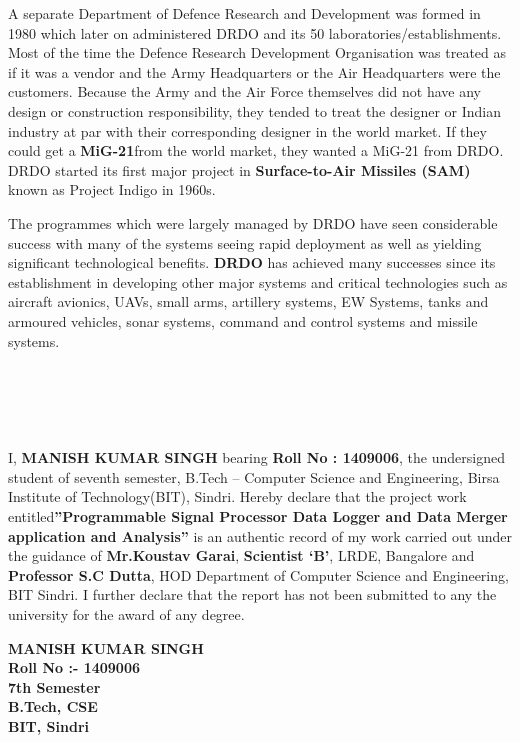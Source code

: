 \documentclass[14pt]{article} %
\begin{document}
  \par            A separate Department of Defence Research and Development was formed in 1980 which later on administered DRDO and its 50 laboratories/establishments. Most of the time the Defence Research Development Organisation was treated as if it was a vendor and the Army Headquarters or the Air Headquarters were the customers. Because the Army and the Air Force themselves did not have any design or construction responsibility, they tended to treat the designer or Indian industry at par with their corresponding designer in the world market. If they could get a \textbf{MiG-21}from the world market, they wanted a MiG-21 from DRDO. DRDO started its first major project in \textbf{Surface-to-Air Missiles (SAM)} known as Project Indigo in 1960s.\\
  \par               The programmes which were largely managed by DRDO have seen considerable success with many of the systems seeing rapid deployment as well as yielding significant technological benefits. \textbf{DRDO} has achieved many successes since its establishment in developing other major systems and critical technologies such as aircraft avionics, UAVs, small arms, artillery systems, EW Systems, tanks and armoured vehicles, sonar systems, command and control systems and missile systems.

\newpage
\thispagestyle{plain}
\section*{\LARGE\bfseries{\\ }}
 I, \textbf{MANISH KUMAR SINGH} bearing \textbf{Roll No : 1409006}, the undersigned student of seventh semester, B.Tech – Computer Science and Engineering, Birsa Institute of Technology(BIT), Sindri. Hereby declare that the project work entitled\textbf{”Programmable Signal Processor Data Logger and Data Merger application and Analysis”} is an authentic record of my work carried out under the guidance of \textbf{Mr.Koustav Garai}, \textbf{Scientist `B'}, LRDE, Bangalore and \textbf{Professor S.C Dutta}, HOD Department of Computer Science and Engineering, BIT Sindri. I further declare that the report has not been submitted to any the university for the award of any degree.
  
  \vspace{2cm}
  \begin{flushright}
 \begin{minipage}[t]{7cm}

\centering
\textbf{ MANISH KUMAR SINGH \\
 Roll No :- 1409006 \\
7th Semester \\
 B.Tech, CSE\\
BIT, Sindri}

 \end{minipage}
 
 \end{flushright}
\end{document}
